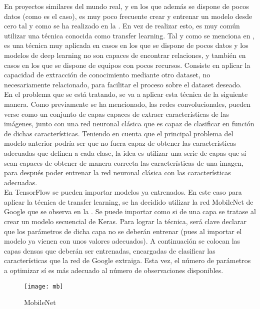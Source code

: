 			En proyectos similares del mundo real, y en los que además se dispone de pocos datos (como es el caso), es muy poco frecuente crear y entrenar un modelo desde cero tal y como se ha realizado en la . En vez de realizar esto, es muy común utilizar una técnica conocida como transfer learning. Tal y como se menciona en \cite{transfer}, es una técnica muy aplicada en casos en los que se dispone de pocos datos y los modelos de deep learning no son capaces de encontrar relaciones, y también en casos en los que se dispone de equipos con pocos recursos. Consiste en aplicar la capacidad de extracción de conocimiento mediante otro dataset, no necesariamente relacionado, para facilitar el proceso sobre el dataset deseado. \\
			
			En el problema que se está tratando, se va a aplicar esta técnica de la siguiente manera. Como previamente se ha mencionado, las redes convolucionales, pueden verse como un conjunto de capas capaces de extraer características de las imágenes, junto con una red neuronal clásica que es capaz de clasificar en función de dichas características. Teniendo en cuenta que el principal problema del modelo anterior podría ser que no fuera capaz de obtener las características adecuadas que definen a cada clase, la idea es utilizar una serie de capas que sí sean capaces de obtener de manera correcta las características de una imagen, para después poder entrenar la red neuronal clásica con las características adecuadas. \\
			
			En TensorFlow se pueden importar modelos ya entrenados. En este caso para aplicar la técnica de transfer learning, se ha decidido utilizar la red MobileNet de Google que se observa en la . Se puede importar como si de una capa se tratase al crear un modelo secuencial de Keras. Para lograr la técnica, será clave declarar que los parámetros de dicha capa no se deberán entrenar (pues al importar el modelo ya vienen con unos valores adecuados). A continuación se colocan las capas densas que deberán ser entrenadas, encargadas de clasificar las características que la red de Google extraiga. Esta vez, el número de parámetros a optimizar sí es más adecuado al número de observaciones disponibles. 
			
			\begin{figure}[!h]
				\centering
				\texttt{[image: mb]}
				\caption{MobileNet \cite{mobilenet}}
				\label{fig:mb}
			\end{figure}
			
